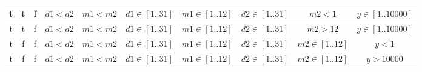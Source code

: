 \documentclass[12pt,a4paper]{article}
\begin{document}
\begin{tabular}{|c|c|c|c|c|c|c|c|c|c|}
\hline
t & t & f & $d1 < d2$ & $m1 < m2$ & $d1 \in [1..31]$ & $m1 \in [1..12]$ & $d2 \in [1..31]$ & $m2 < 1$ & $y \in [1..10000]$ \\
\hline
t & t & f & $d1 < d2$ & $m1 < m2$ & $d1 \in [1..31]$ & $m1 \in [1..12]$ & $d2 \in [1..31]$ & $m2 > 12$ & $y \in [1..10000]$ \\
\hline
t & f & f & $d1 < d2$ & $m1 < m2$ & $d1 \in [1..31]$ & $m1 \in [1..12]$ & $d2 \in [1..31]$ & $m2 \in [1..12]$ & $y < 1$ \\
\hline
t & f & f & $d1 < d2$ & $m1 < m2$ & $d1 \in [1..31]$ & $m1 \in [1..12]$ & $d2 \in [1..31]$ & $m2 \in [1..12]$ & $y > 10000$ \\
\hline
\end{tabular}
\end{document}
